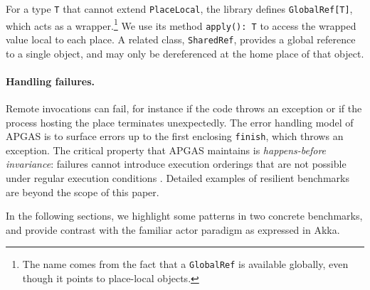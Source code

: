 For a type \lstinline{T} that cannot extend \lstinline{PlaceLocal}, the library
defines \lstinline{GlobalRef[T]}, which acts as a wrapper.\footnote{The name
comes from the fact that a \lstinline{GlobalRef} is available globally,
even though it points to place-local objects.}
We use its method \lstinline{apply(): T} to access the
wrapped value local to each place.
A related class, \lstinline{SharedRef}, provides a global reference to a single object, and may only be dereferenced at the home place of that object.

\paragraph{Handling failures.} Remote invocations can fail, for instance if the
code throws an exception or if the process hosting the place terminates
unexpectedly. The error handling model of APGAS is to surface errors up to the
first enclosing \lstinline{finish}, which throws an exception. The critical
property that APGAS maintains is \emph{happens-before invariance}: failures
cannot introduce execution orderings that are not possible under regular
execution conditions \cite{ppopp14,ecoop14}. Detailed examples of resilient
benchmarks are beyond the scope of this paper.

% 
% 
% 
% 
% 
% 
In the following sections, we highlight some \apgas patterns in two concrete
benchmarks, and provide contrast with the familiar actor paradigm as expressed in Akka.
